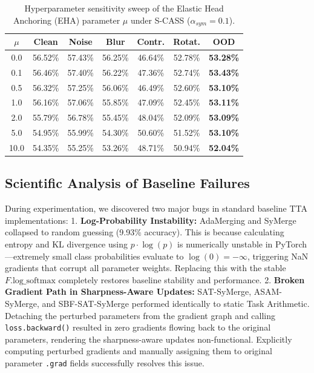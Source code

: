 \documentclass{article}
\theoremstyle{plain}
\theoremstyle{definition}
\theoremstyle{remark}
\begin{document}
\begin{table}[t]
\caption{Hyperparameter sensitivity sweep of the Elastic Head Anchoring (EHA) parameter $\mu$ under S-CASS ($\alpha_{sym}=0.1$).}
\label{tab:mu_sweep}
\vskip 0.15in
\begin{center}
\begin{footnotesize}
\begin{sc}
\setlength{\tabcolsep}{2.5pt}
\begin{tabular}{ccccccc}
\toprule
$\mu$ & Clean & Noise & Blur & Contr. & Rotat. & OOD \\
\midrule
0.0 & 56.52\% & 57.43\% & 56.25\% & 46.64\% & 52.78\% & \textbf{53.28\%} \\
0.1 & 56.46\% & 57.40\% & 56.22\% & 47.36\% & 52.74\% & \textbf{53.43\%} \\
0.5 & 56.32\% & 57.25\% & 56.06\% & 46.49\% & 52.60\% & \textbf{53.10\%} \\
1.0 & 56.16\% & 57.06\% & 55.85\% & 47.09\% & 52.45\% & \textbf{53.11\%} \\
2.0 & 55.79\% & 56.78\% & 55.45\% & 48.04\% & 52.09\% & \textbf{53.09\%} \\
5.0 & 54.95\% & 55.99\% & 54.30\% & 50.60\% & 51.52\% & \textbf{53.10\%} \\
10.0 & 54.35\% & 55.25\% & 53.26\% & 48.71\% & 50.94\% & \textbf{52.04\%} \\
\bottomrule
\end{tabular}
\end{sc}
\end{footnotesize}
\end{center}
\vskip -0.1in
\end{table}

\subsection{Scientific Analysis of Baseline Failures}
During experimentation, we discovered two major bugs in standard baseline TTA implementations:
1. \textbf{Log-Probability Instability:} AdaMerging and SyMerge collapsed to random guessing (9.93\% accuracy). This is because calculating entropy and KL divergence using $p\cdot \log(p)$ is numerically unstable in PyTorch—extremely small class probabilities evaluate to $\log(0) = -\infty$, triggering NaN gradients that corrupt all parameter weights. Replacing this with the stable $F.\text{log\_softmax}$ completely restores baseline stability and performance.
2. \textbf{Broken Gradient Path in Sharpness-Aware Updates:} SAT-SyMerge, ASAM-SyMerge, and SBF-SAT-SyMerge performed identically to static Task Arithmetic. Detaching the perturbed parameters from the gradient graph and calling \texttt{loss.backward()} resulted in zero gradients flowing back to the original parameters, rendering the sharpness-aware updates non-functional. Explicitly computing perturbed gradients and manually assigning them to original parameter \texttt{.grad} fields successfully resolves this issue.
\end{document}
